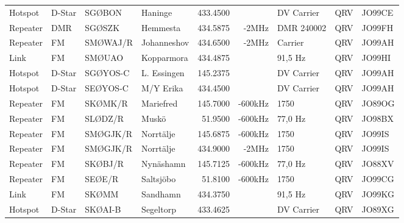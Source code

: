 \begin{landscape}
\begin{longtable}{llllrrlcl}
	Hotspot           & D-Star       & SGØBON        & Haninge      &          433.4500 &                & DV Carrier      &       QRV       & JO99CE           \\
	Repeater          & DMR          & SGØSZK        & Hemmesta     &          434.5875 &          -2MHz & DMR 240002      &       QRV       & JO99FH           \\
	Repeater          & FM           & SMØWAJ/R      & Johanneshov  &          434.6500 &          -2MHz & Carrier         &       QRV       & JO99AH           \\
	Link              & FM           & SMØUAO        & Kopparmora   &          434.4875 &                & 91,5 Hz         &       QRV       & JO99HI           \\
	Hotspot           & D-Star       & SGØYOS-C      & L. Essingen  &          145.2375 &                & DV Carrier      &       QRV       & JO99AH           \\
	Hotspot           & D-Star       & SEØYOS-C      & M/Y Erika    &          434.4500 &                & DV Carrier      &       QRV       & JO99AH           \\
	Repeater          & FM           & SKØMK/R       & Mariefred    &          145.7000 &        -600kHz & 1750           &       QRV       & JO89OG           \\
	Repeater          & FM           & SLØDZ/R       & Muskö        &           51.9500 &        -600kHz & 77,0 Hz          &       QRV       & JO98BX           \\
	Repeater          & FM           & SMØGJK/R      & Norrtälje    &          145.6875 &        -600kHz & 1750         &       QRV       & JO99IS           \\
	Repeater          & FM           & SMØGJK/R      & Norrtälje    &          434.9000 &          -2MHz & 1750         &       QRV       & JO99IS           \\
	Repeater          & FM           & SKØBJ/R       & Nynäshamn    &          145.7125 &        -600kHz & 77,0 Hz         &       QRV       & JO88XV           \\
	Repeater          & FM           & SEØE/R        & Saltsjöbo    &           51.8100 &        -600kHz & 1750         &       QRV       & JO99CG           \\
	Link              & FM           & SKØMM         & Sandhamn     &          434.3750 &                & 91,5 Hz         &       QRV       & JO99KG           \\
	Hotspot           & D-Star       & SKØAI-B       & Segeltorp    &          433.4625 &                & DV Carrier      &       QRV       & JO89XG           \\

\end{longtable}
\end{landscape}
